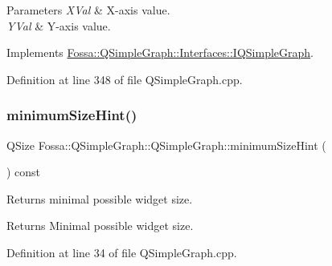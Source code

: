 \begin{DoxyParams}{Parameters}
{\em X\+Val} & X-\/axis value. \\
\hline
{\em Y\+Val} & Y-\/axis value. \\
\hline
\end{DoxyParams}


Implements \hyperlink{class_fossa_1_1_q_simple_graph_1_1_interfaces_1_1_i_q_simple_graph_a5d43e4e0f06bedb1734e4240070fe229}{Fossa\+::\+Q\+Simple\+Graph\+::\+Interfaces\+::\+I\+Q\+Simple\+Graph}.



Definition at line 348 of file Q\+Simple\+Graph.\+cpp.

\mbox{\label{class_fossa_1_1_q_simple_graph_1_1_q_simple_graph_a2b427ee7fc54efd87a33d0a23bbdd1f8}} 
\subsubsection{\texorpdfstring{minimum\+Size\+Hint()}{minimumSizeHint()}}
{\footnotesize\ttfamily Q\+Size Fossa\+::\+Q\+Simple\+Graph\+::\+Q\+Simple\+Graph\+::minimum\+Size\+Hint (\begin{DoxyParamCaption}{ }\end{DoxyParamCaption}) const}



Returns minimal possible widget size. 

\begin{DoxyReturn}{Returns}
Minimal possible widget size. 
\end{DoxyReturn}


Definition at line 34 of file Q\+Simple\+Graph.\+cpp.

\mbox{\label{class_fossa_1_1_q_simple_graph_1_1_q_simple_graph_a7ae9773902324fc533f0b18294f7c516}} 
